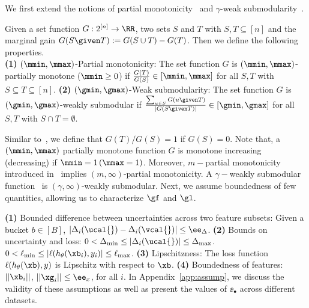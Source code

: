 \documentclass[letterpaper]{article}
\renewcommand{\cite}{\citep}
\begin{document}
We first extend the   notions of  partial monotonicity~\cite{mualem2022using}
and $\gamma$-weak submodularity~\cite{elenberg2018restricted,harshaw2019submodular}.
\begin{definition}
 Given a set function $G:2^{[n]} \to \RR $, two sets $S$ and $T$ with $S,T \subseteq [n]$ and the marginal gain $G(S\given T):= G(S\cup T) - G(T)$. Then we define the following properties.\\
\textbf{ (1)} $(\mmin,\mmax)$-Partial monotonicity: The set function $G$ is $(\mmin,\mmax)$-partially monotone ($\mmin \ge 0$)  if $\frac{G(T)}{G(S)} \in [\mmin,\mmax]$ for all $S,T$ with $S\subseteq T \subseteq [n]$. 
 \textbf{ (2)} $(\gmin,\gmax)$-Weak submodularity: The set function $G$ is $(\gmin,\gmax)$-weakly submodular  if $\frac{\sum_{u\in S}G(u\given T)}{|G(S\given T)|} \in [\gmin,\gmax]$ for all $S,T$ with $S\cap T = \emptyset$.
\end{definition}
Similar to~\citet{mualem2022using}, we define that $G(T)/G(S)=1$ if $G(S) = 0$. Note that,  a $(\mmin,\mmax)$ partially monotone function $G$ is monotone increasing (decreasing) if $\mmin = 1\, (\mmax =1)$. Moreover,  $m-$partial monotonicity introduced in~\cite{mualem2022using} implies $(m,\infty)$-partial monotonicity. A $\gamma-$weakly submodular function~\cite{elenberg2018restricted,harshaw2019submodular} is $(\gamma,\infty)$-weakly submodular. Next, we assume  boundedness of few quantities, allowing us to characterize $\gf$ and $\gl$.
\begin{assumption} 
\label{assumption}
\textbf{(1)} Bounded difference between uncertainties across two feature subsets:
Given a bucket $b\in [B]$, $|\Delta_i(\ucal{}) - \Delta_i(\vcal{})| \le \ee_{\Delta}$.
\textbf{(2)} Bounds on uncertainty and loss: 
$0< \Delta_{\min} \le |\Delta_i(\ucal{})| \le \Delta_{\max} $.
$ 0< \ell_{\min} \le |\ell(h_\theta(\xb_i),y_i)| \le \ell_{\max}$.
\textbf{(3)} Lipschitzness: The loss function $\ell(h_\theta(\xb),y)$ is Lipschitz with respect to $\xb$. \textbf{(4)} Boundedness of features: $||\xb_i||$, $||\xg_i|| \le \ee_x$, for all $i$. 
In Appendix~\ref{app:assump}, we discuss the validity of these assumptions as well as present the values of $\ee_\bullet$ across different datasets.
\end{assumption}
\end{document}
